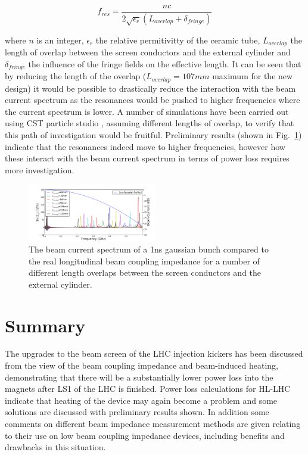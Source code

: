 \documentclass[a4paper,
              ]{jacow}
\begin{document}
\begin{equation}
f_{res} = \frac{n c}{2 \sqrt{\epsilon_{r}}\left( L_{overlap} + \delta_{fringe} \right)}
\end{equation}

where $n$ is an integer, $\epsilon_{r}$ the relative permitivitty of the ceramic tube, $L_{overlap}$ the length of overlap between the screen conductors and the external cylinder and $\delta_{fringe}$ the influence of the fringe fields on the effective length. It can be seen that by reducing the length of the overlap ($L_{overlap}=107mm$ maximum for the new design) it would be possible to drastically reduce the interaction with the beam current spectrum as the resonances would be pushed to higher frequencies where the current spectrum is lower. A number of simulations have been carried out using CST particle studio \cite{cst-cite}, assuming different lengths of overlap, to verify that this path of investigation would be fruitful. Preliminary results (shown in Fig.~\ref{fig:overLapSpec}) indicate that the resonances indeed move to higher frequencies, however how these interact with the beam current spectrum in terms of power loss requires more investigation.

\begin{figure}
\includegraphics[width=0.5\textwidth]{overlapSpec.pdf}
\caption{The beam current spectrum of a 1ns gaussian bunch compared to the real longitudinal beam coupling impedance for a number of different length overlaps between the screen conductors and the external cylinder.}
\label{fig:overLapSpec}
\end{figure}

\section{Summary}

The upgrades to the beam screen of the LHC injection kickers has been discussed from the view of the beam coupling impedance and beam-induced heating, demonstrating that there will be a substantially lower power loss into the magnets after LS1 of the LHC is finished. Power loss calculations for HL-LHC indicate that heating of the device may again become a problem and some solutions are discussed with preliminary results shown. In addition some comments on different beam impedance measurement methods are given relating to their use on low beam coupling impedance devices, including benefits and drawbacks in this situation.
\end{document}
